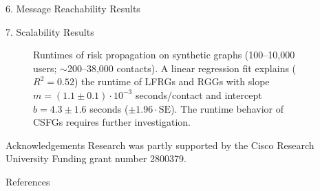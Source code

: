 \documentclass[final]{beamer}
\newlength{\sepwidth}
\newlength{\colwidth}
\newcommand{\separatorcolumn}{\begin{column}{\sepwidth}\end{column}}
\begin{document}
\begin{frame}[t]
\begin{columns}[t]
\begin{column}{\colwidth}
\begin{block}{6. Message Reachability Results}
\begin{table}
		\end{table}
	\end{block}
	\begin{block}{7. Scalability Results}
		\begin{figure}
			\centering
			\caption{Runtimes of risk propagation on synthetic graphs (100--10,000 users; $\sim$200--38,000 contacts). A linear regression fit explains ($R^2 = 0.52$) the runtime of LFRGs and RGGs with slope $m = (1.1 \pm 0.1) \cdot 10^{-3}$ seconds/contact and intercept $b = 4.3 \pm 1.6$ seconds ($\pm 1.96 \cdot \mathrm{SE}$). The runtime behavior of CSFGs requires further investigation.}
			\label{fig:scalability}
		\end{figure}
	\end{block}
	\begin{block}{Acknowledgements}
		Research was partly supported by the Cisco Research University Funding grant number 2800379.
	\end{block}
	\begin{block}{References}
		\nocite{*}
		\scriptsize{}
	\end{block}
\end{column}
\separatorcolumn
\end{columns}
\end{frame}
\end{document}
